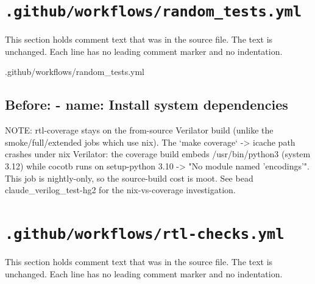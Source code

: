 \section{\texttt{.github/workflows/random\_tests.yml}}\label{um:flow:ci-random-tests}

This section holds comment text that was in the source file. The text is unchanged. Each line has no leading comment marker and no indentation.

\begin{relocated}{.github/workflows/random_tests.yml}

\subsection*{Before: - name: Install system dependencies}

\begin{textblock}
NOTE: rtl-coverage stays on the from-source Verilator build (unlike the
smoke/full/extended jobs which use nix). The `make coverage` -> icache path
crashes under nix Verilator: the coverage build embeds /usr/bin/python3
(system 3.12) while cocotb runs on setup-python 3.10 -> "No module named
'encodings'". This job is nightly-only, so the source-build cost is moot.
See bead claude_verilog_test-hg2 for the nix-vs-coverage investigation.
\end{textblock}

\end{relocated}

\section{\texttt{.github/workflows/rtl-checks.yml}}\label{um:flow:ci-rtl-checks}

This section holds comment text that was in the source file. The text is unchanged. Each line has no leading comment marker and no indentation.

